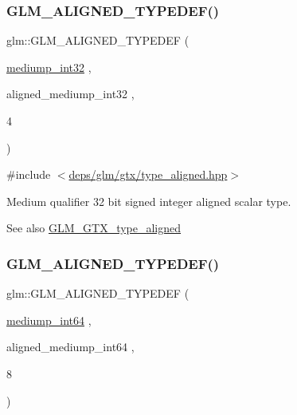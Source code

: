 \subsubsection{\texorpdfstring{G\+L\+M\+\_\+\+A\+L\+I\+G\+N\+E\+D\+\_\+\+T\+Y\+P\+E\+D\+E\+F()}{GLM\_ALIGNED\_TYPEDEF()}\hspace{0.1cm}{\footnotesize\ttfamily [15/209]}}
{\footnotesize\ttfamily glm\+::\+G\+L\+M\+\_\+\+A\+L\+I\+G\+N\+E\+D\+\_\+\+T\+Y\+P\+E\+D\+EF (\begin{DoxyParamCaption}\item[{\hyperlink{group__gtc__type__precision_ga0660a752402702f420f13c686a7fff29}{mediump\+\_\+int32}}]{,  }\item[{aligned\+\_\+mediump\+\_\+int32}]{,  }\item[{4}]{ }\end{DoxyParamCaption})}



{\ttfamily \#include $<$\hyperlink{gtx_2type__aligned_8hpp}{deps/glm/gtx/type\+\_\+aligned.\+hpp}$>$}

Medium qualifier 32 bit signed integer aligned scalar type. \begin{DoxySeeAlso}{See also}
\hyperlink{group__gtx__type__aligned}{G\+L\+M\+\_\+\+G\+T\+X\+\_\+type\+\_\+aligned} 
\end{DoxySeeAlso}
\mbox{\label{group__gtx__type__aligned_gad9e5babb1dd3e3531b42c37bf25dd951}} 
\subsubsection{\texorpdfstring{G\+L\+M\+\_\+\+A\+L\+I\+G\+N\+E\+D\+\_\+\+T\+Y\+P\+E\+D\+E\+F()}{GLM\_ALIGNED\_TYPEDEF()}\hspace{0.1cm}{\footnotesize\ttfamily [16/209]}}
{\footnotesize\ttfamily glm\+::\+G\+L\+M\+\_\+\+A\+L\+I\+G\+N\+E\+D\+\_\+\+T\+Y\+P\+E\+D\+EF (\begin{DoxyParamCaption}\item[{\hyperlink{group__gtc__type__precision_ga603c695fe5cd677d3f72a81343e19a74}{mediump\+\_\+int64}}]{,  }\item[{aligned\+\_\+mediump\+\_\+int64}]{,  }\item[{8}]{ }\end{DoxyParamCaption})}



